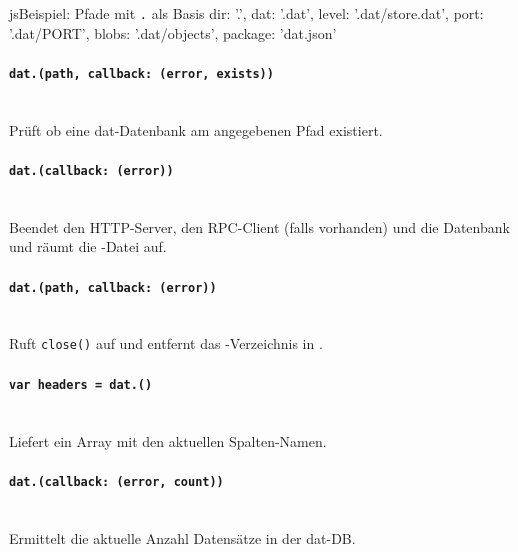 \begin{srclst}{js}{Beispiel: Pfade mit \texttt{.} als Basis}
{ 
    dir: '.',
    dat: '.dat',
    level: '.dat/store.dat',
    port: '.dat/PORT',
    blobs: '.dat/objects',
    package: 'dat.json' 
}
\end{srclst}

\paragraph{\texttt{dat.(path, callback: (error, exists))}} ~\\
Prüft ob eine dat-Datenbank am angegebenen Pfad existiert.

\paragraph{\texttt{dat.(callback: (error))}} ~\\
Beendet den HTTP-Server, den RPC-Client (falls vorhanden) und die Datenbank und räumt die -Datei auf.

\paragraph{\texttt{dat.(path, callback: (error))}} ~\\
Ruft \texttt{close()} auf und entfernt das -Verzeichnis in .

\paragraph{\texttt{var headers = dat.()}} ~\\
Liefert ein Array mit den aktuellen Spalten-Namen.

\paragraph{\texttt{dat.(callback: (error, count))}} ~\\
Ermittelt die aktuelle Anzahl Datensätze in der dat-DB.



